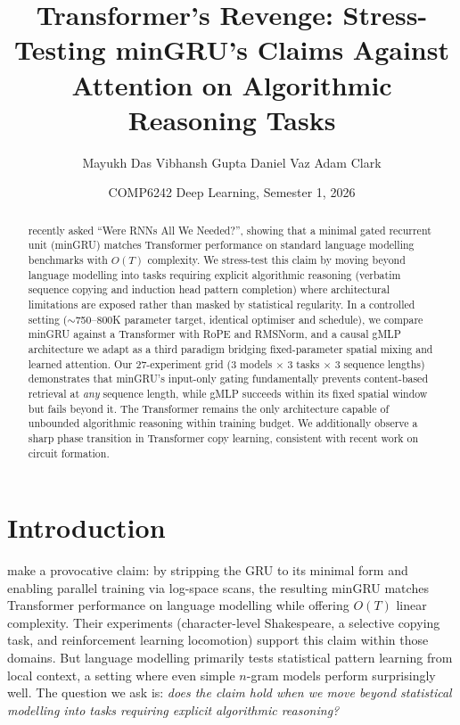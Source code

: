 \documentclass[10pt,a4paper]{article}
\title{\textbf{Transformer's Revenge: Stress-Testing minGRU's Claims Against Attention on Algorithmic Reasoning Tasks}}
\author{
  Mayukh Das \quad Vibhansh Gupta \quad Daniel Vaz \quad Adam Clark
}
\date{COMP6242 Deep Learning, Semester 1, 2026}
\begin{document}
\maketitle

\begin{abstract}
\citet{feng2024were} recently asked ``Were RNNs All We Needed?'', showing that a minimal gated recurrent unit (minGRU) matches Transformer performance on standard language modelling benchmarks with $O(T)$ complexity. We stress-test this claim by moving beyond language modelling into tasks requiring explicit algorithmic reasoning (verbatim sequence copying and induction head pattern completion) where architectural limitations are exposed rather than masked by statistical regularity. In a controlled setting (${\sim}$750--800K parameter target, identical optimiser and schedule), we compare minGRU against a Transformer with RoPE and RMSNorm, and a causal gMLP architecture we adapt as a third paradigm bridging fixed-parameter spatial mixing and learned attention. Our 27-experiment grid ($3$ models $\times$ $3$ tasks $\times$ $3$ sequence lengths) demonstrates that minGRU's input-only gating fundamentally prevents content-based retrieval at \emph{any} sequence length, while gMLP succeeds within its fixed spatial window but fails beyond it. The Transformer remains the only architecture capable of unbounded algorithmic reasoning within training budget. We additionally observe a sharp phase transition in Transformer copy learning, consistent with recent work on circuit formation.
\end{abstract}

\section{Introduction}

\citet{feng2024were} make a provocative claim: by stripping the GRU to its minimal form and enabling parallel training via log-space scans, the resulting minGRU matches Transformer performance on language modelling while offering $O(T)$ linear complexity. Their experiments (character-level Shakespeare, a selective copying task, and reinforcement learning locomotion) support this claim within those domains. But language modelling primarily tests statistical pattern learning from local context, a setting where even simple $n$-gram models perform surprisingly well. The question we ask is: \emph{does the claim hold when we move beyond statistical modelling into tasks requiring explicit algorithmic reasoning?}
\end{document}
